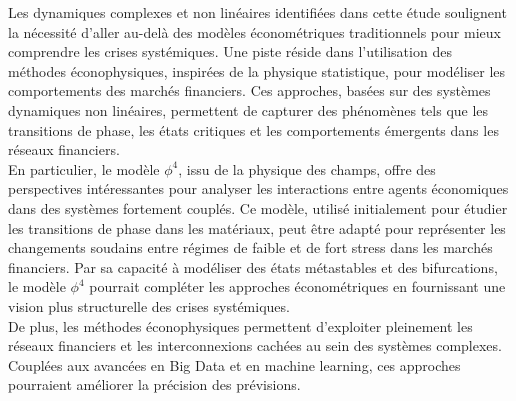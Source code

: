 Les dynamiques complexes et non linéaires identifiées dans cette étude soulignent la nécessité d’aller au-delà des modèles économétriques traditionnels pour mieux comprendre les crises systémiques. Une piste réside dans l’utilisation des méthodes éconophysiques, inspirées de la physique statistique, pour modéliser les comportements des marchés financiers. Ces approches, basées sur des systèmes dynamiques non linéaires, permettent de capturer des phénomènes tels que les transitions de phase, les états critiques et les comportements émergents dans les réseaux financiers.\\

En particulier, le modèle $\phi^4$, issu de la physique des champs, offre des perspectives intéressantes pour analyser les interactions entre agents économiques dans des systèmes fortement couplés. Ce modèle, utilisé initialement pour étudier les transitions de phase dans les matériaux, peut être adapté pour représenter les changements soudains entre régimes de faible et de fort stress dans les marchés financiers. Par sa capacité à modéliser des états métastables et des bifurcations, le modèle $\phi^4$ pourrait compléter les approches économétriques en fournissant une vision plus structurelle des crises systémiques.\\

De plus, les méthodes éconophysiques permettent d'exploiter pleinement les réseaux financiers et les interconnexions cachées au sein des systèmes complexes. Couplées aux avancées en Big Data et en machine learning, ces approches pourraient améliorer la précision des prévisions.